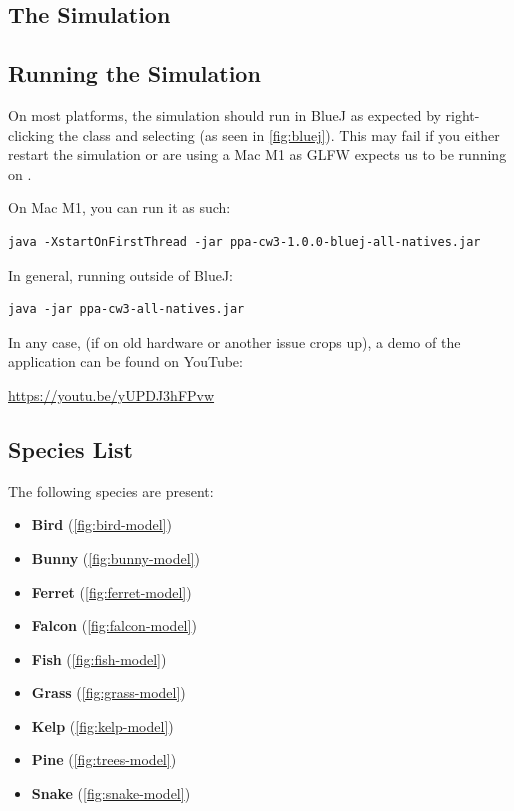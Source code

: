 \documentclass{article}
\begin{document}
    \begin{multicols}{2}
        \section{The Simulation}

        \subsection{Running the Simulation}

            On most platforms, the simulation should run in BlueJ \cite{BlueJ} as expected by right-clicking the  class and selecting  (as seen in \autoref{fig:bluej}).
            This may fail if you either restart the simulation or are using a Mac M1 as GLFW expects us to be running on .

            On Mac M1, you can run it as such:

            \begin{lstlisting}
java -XstartOnFirstThread -jar ppa-cw3-1.0.0-bluej-all-natives.jar\end{lstlisting}

            In general, running outside of BlueJ:

            \begin{lstlisting}
java -jar ppa-cw3-all-natives.jar\end{lstlisting}

            In any case, (if on old hardware or another issue crops up), a demo of the application can be found on YouTube:

            \url{https://youtu.be/yUPDJ3hFPvw}

        \subsection{Species List}

            The following species are present:

            \begin{itemize}
                \setlength\itemsep{0.01em}
                \item \textbf{Bird} (\autoref{fig:bird-model})
                \item \textbf{Bunny} (\autoref{fig:bunny-model})
                \item \textbf{Ferret} (\autoref{fig:ferret-model})
                \item \textbf{Falcon} (\autoref{fig:falcon-model})
                \item \textbf{Fish} (\autoref{fig:fish-model})
                \item \textbf{Grass} (\autoref{fig:grass-model})
                \item \textbf{Kelp} (\autoref{fig:kelp-model})
                \item \textbf{Pine} (\autoref{fig:trees-model})
                \item \textbf{Snake} (\autoref{fig:snake-model})
            \end{itemize}


\end{multicols}
\end{document}
